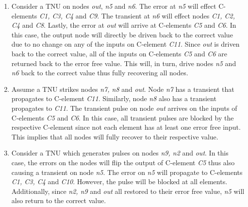 \begin{enumerate}
	\item Consider a TNU on nodes \textit{out}, \textit{n5} and \textit{n6}. The error at \textit{n5} will effect C-elements \textit{C1, C3, C4} and \textit{C9}. The transient at \textit{n6} will effect nodes \textit{C1, C2, C4} and \textit{C8}. Lastly, the error at \textit{out} will arrive at C-elements \textit{C5} and \textit{C6}. In this case, the output node will directly be driven back to the correct value due to no change on any of the inputs on C-element \textit{C11}. Since \textit{out} is driven back to the correct value, all of the inputs on C-elements \textit{C5} and \textit{C6} are returned back to the error free value. This will, in turn, drive nodes \textit{n5} and \textit{n6} back to the correct value thus fully recovering all nodes.
	
	\item Assume a TNU strikes nodes \textit{n7, n8} and \textit{out}. Node \textit{n7} has a transient that propagates to C-element \textit{C11}. Similarly, node \textit{n8} also has a transient propagates to \textit{C11}. The transient pulse on node \textit{out} arrives on the inputs of C-elements \textit{C5} and \textit{C6}. In this case, all transient pulses are blocked by the respective C-element since not each element has at least one error free input. This implies that all nodes will fully recover to their respective value.
	
	\item Consider a TNU which generates pulses on nodes \textit{n9, n2} and \textit{out}. In this case, the errors on the nodes will flip the output of C-element \textit{C5} thus also causing a transient on node \textit{n5}. The error on \textit{n5} will propagate to C-elements \textit{C1, C3, C4} and \textit{C10}. However, the pulse will be blocked at all elements. Additionally, since \textit{n2, n9} and \textit{out} all restored to their error free value, \textit{n5} will also return to the correct value.
\end{enumerate}

